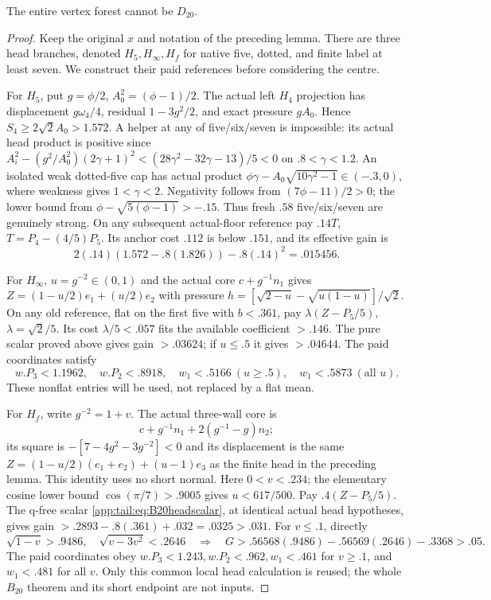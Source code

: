 \begin{lemma}\label{app:tail:lem:wholeD20}
The entire vertex forest cannot be $D_{20}$.
\end{lemma}
\begin{proof}
Keep the original $x$ and notation of the preceding lemma. There
are three head branches, denoted $H_5,H_\infty,H_f$ for native
five, dotted, and finite label at least seven. We construct their
paid references before considering the centre.

For $H_5$, put $g=\phi/2$, $A_0^2=(\phi-1)/2$.
The actual left $H_4$ projection has displacement
$g\omega_4/4$, residual $1-3g^2/2$, and exact pressure
$gA_0$. Hence $S_4\ge2\sqrt2A_0>1.572$.
A helper at any of five/six/seven is impossible: its actual
head product is positive since
$A_i^2-(g^2/A_0^2)(2\gamma+1)^2
<(28\gamma^2-32\gamma-13)/5<0$ on $.8<\gamma<1.2$.
An isolated weak dotted-five cap has actual product
$\phi\gamma-A_0\sqrt{10\gamma^2-1}\in(-.3,0)$,
where weakness gives $1<\gamma<2$.
Negativity follows from $(7\phi-11)/2>0$;
the lower bound from $\phi-\sqrt{5(\phi-1)}>-.15$.
Thus fresh $.58$ five/six/seven are genuinely strong.
On any subsequent actual-floor reference pay
$.14T$, $T=P_4-(4/5)P_5$.
Its anchor cost $.112$ is below $.151$, and its effective gain is
\[
 2(.14)(1.572-.8(1.826))-.8(.14)^2=.015456.
\]

For $H_\infty$, $u=g^{-2}\in(0,1)$ and the actual core
$c+g^{-1}n_1$ gives
$Z=(1-u/2)e_1+(u/2)e_2$ with pressure
$h=[\sqrt{2-u}-\sqrt{u(1-u)}]/\sqrt2$.
On any old reference, flat on the first five with $b<.361$,
pay $\lambda(Z-P_5/5)$, $\lambda=\sqrt2/5$.
Its cost $\lambda/5<.057$ fits the available coefficient
$>.146$. The pure scalar proved above gives gain $>.03624$;
if $u\le.5$ it gives $>.04644$.
The paid coordinates satisfy
\[
 w.P_3<1.1962,\quad w.P_2<.8918,\quad
 w_1<.5166\ (u\ge.5),\quad w_1<.5873\ (\text{all }u).
\]
These nonflat entries will be used, not replaced by a flat mean.

For $H_f$, write $g^{-2}=1+v$. The actual three-wall core is
\[
 c+g^{-1}n_1+2(g^{-1}-g)n_2;
\]
its square is $-[7-4g^2-3g^{-2}]<0$ and its displacement is
the same $Z=(1-u/2)(e_1+e_2)+(u-1)e_3$ as the finite head
in the preceding lemma. This identity uses no short normal.
Here $0<v<.234$; the elementary cosine lower bound
$\cos(\pi/7)>.9005$ gives $u<617/500$.
Pay $.4(Z-P_5/5)$. The q-free scalar
\eqref{app:tail:eq:B20headscalar}, at identical actual head
hypotheses, gives gain
$>.2893-.8(.361)+.032=.0325>.031$.
For $v\le.1$, directly
\[
 \sqrt{1-v}>.9486,\quad \sqrt{v-3v^2}<.2646
 \quad\Longrightarrow\quad
 G>.56568(.9486)-.56569(.2646)-.3368>.05.
\]
The paid coordinates obey
$w.P_3<1.243,w.P_2<.962,w_1<.461$ for $v\ge.1$,
and $w_1<.481$ for all $v$.
Only this common local head calculation is reused; the whole
$B_{20}$ theorem and its short endpoint are not inputs.


\end{proof}
